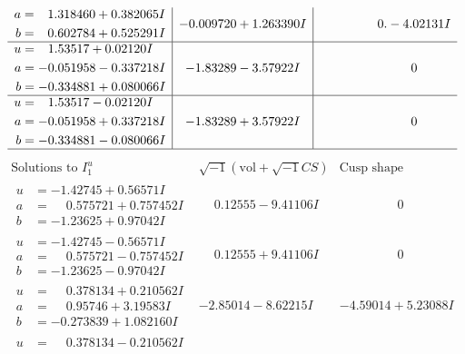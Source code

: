 \documentclass[1p]{elsarticle_modified}
\theoremstyle{definition}
\newcommand{\I}{\sqrt{-1}}
\begin{document}
$$\begin{array}{c|c|c}
\begin{aligned}
a &= \phantom{-}1.318460 + 0.382065 I \\
b &= \phantom{-}0.602784 + 0.525291 I\end{aligned}
 & -0.009720 + 1.263390 I & \phantom{-0.000000 } 0. - 4.02131 I \\ \hline\begin{aligned}
u &= \phantom{-}1.53517 + 0.02120 I \\
a &= -0.051958 - 0.337218 I \\
b &= -0.334881 + 0.080066 I\end{aligned}
 & -1.83289 - 3.57922 I & \phantom{-0.000000 } 0 \\ \hline\begin{aligned}
u &= \phantom{-}1.53517 - 0.02120 I \\
a &= -0.051958 + 0.337218 I \\
b &= -0.334881 - 0.080066 I\end{aligned}
 & -1.83289 + 3.57922 I & \phantom{-0.000000 } 0\\
 \hline 
 \end{array}$$\newpage$$\begin{array}{c|c|c}  
\text{Solutions to }I^u_{1}& \I (\text{vol} + \sqrt{-1}CS) & \text{Cusp shape}\\
 \hline 
\begin{aligned}
u &= -1.42745 + 0.56571 I \\
a &= \phantom{-}0.575721 + 0.757452 I \\
b &= -1.23625 + 0.97042 I\end{aligned}
 & \phantom{-}0.12555 - 9.41106 I & \phantom{-0.000000 } 0 \\ \hline\begin{aligned}
u &= -1.42745 - 0.56571 I \\
a &= \phantom{-}0.575721 - 0.757452 I \\
b &= -1.23625 - 0.97042 I\end{aligned}
 & \phantom{-}0.12555 + 9.41106 I & \phantom{-0.000000 } 0 \\ \hline\begin{aligned}
u &= \phantom{-}0.378134 + 0.210562 I \\
a &= \phantom{-}0.95746 + 3.19583 I \\
b &= -0.273839 + 1.082160 I\end{aligned}
 & -2.85014 - 8.62215 I & -4.59014 + 5.23088 I \\ \hline\begin{aligned}
u &= \phantom{-}0.378134 - 0.210562 I \\

\end{aligned}
\end{array}$$
\end{document}
